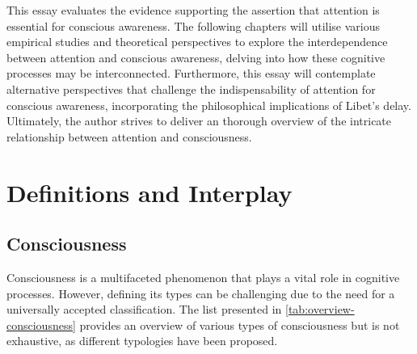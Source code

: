 \documentclass[10pt]{article}
\begin{document}
\begin{sloppypar}
  This essay evaluates the evidence supporting the assertion that attention is essential for conscious awareness. The following chapters will utilise various empirical studies and theoretical perspectives to explore the interdependence between attention and conscious awareness, delving into how these cognitive processes may be interconnected. Furthermore, this essay will contemplate alternative perspectives that challenge the indispensability of attention for conscious awareness, incorporating the philosophical implications of Libet’s delay. Ultimately, the author strives to deliver an thorough overview of the intricate relationship between attention and consciousness.

  \section{Definitions and Interplay}
  \label{sec:background}

  \subsection{Consciousness}
  \label{sec:consciousness}

  Consciousness is a multifaceted phenomenon that plays a vital role in cognitive processes. However, defining its types can be challenging due to the need for a universally accepted classification. The list presented in \autoref{tab:overview-consciousness} provides an overview of various types of consciousness but is not exhaustive, as different typologies have been proposed.


\end{sloppypar}
\end{document}
